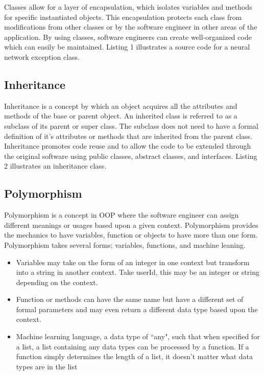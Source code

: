 \documentclass[journal]{IEEEtran}
\begin{document}
Classes allow for a layer of encapsulation, which isolates variables and methods for specific instantiated objects.  This encapsulation protects each class from modifications from other classes or by the software engineer in other areas of the application.  By using classes, software engineers can create well-organized code which can easily be maintained. 
Listing 1 illustrates a source code for a neural network exception class.




\subsection{Inheritance}
Inheritance %
is a concept by which an object acquires all the attributes and methods of the base or parent object.  An inherited class is referred to as a subclass of its parent or super class. The subclass does not need to have a formal definition of it's attributes or methods that are inherited from the parent class.  Inheritance %
promotes code reuse and to allow the code to be extended through the original software using public classes, abstract classes, and interfaces. 
Listing 2 illustrates an inheritance class.

\newpage



\subsection{Polymorphism}
Polymorphism is a concept in %
OOP where the software engineer can assign different meanings or usages based upon 
a given context.
Polymorphism provides the mechanics to have variables, function or objects to have more than one form.  Polymorphism takes several forms; variables, functions, and machine leaning.

\begin{itemize}
    \item Variables may take on the form of an integer in one context but transform into a string in another context.  Take userId, this may be an integer or string depending on the context.

    \item Function or methods can have the same name but have a different set of formal parameters and may even return a different data type based upon the context.

    \item Machine learning language, a data type of ``any", such that when specified for a list, a list containing any data types can be processed by a function. If a function simply determines the length of a list, it doesn't matter what data types are in the list
\end{itemize}
\end{document}
